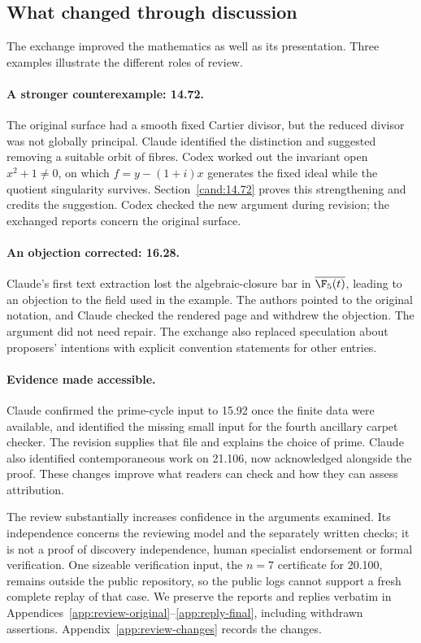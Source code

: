 \subsection{What changed through discussion}

The exchange improved the mathematics as well as its presentation.
Three examples illustrate the different roles of review.

\paragraph{A stronger counterexample: 14.72.}
The original surface had a smooth fixed Cartier divisor, but the reduced
divisor was not globally principal. Claude identified the distinction
and suggested removing a suitable orbit of fibres. Codex worked out
the invariant open \(x^2+1\ne0\), on which
\(f=y-(1+i)x\) generates the fixed ideal while the quotient singularity
survives. Section~\ref{cand:14.72} proves this strengthening and credits
the suggestion. Codex checked the new argument during revision; the exchanged reports
concern the original surface.

\paragraph{An objection corrected: 16.28.}
Claude's first text extraction lost the algebraic-closure bar in
\(\overline{\F_5(t)}\), leading to an objection to the field used in
the example. The authors pointed to the original notation, and Claude
checked the rendered page and withdrew the objection. The argument did
not need repair. The exchange also replaced speculation about proposers'
intentions with explicit convention statements for other entries.

\paragraph{Evidence made accessible.}
Claude confirmed the prime-cycle input to 15.92 once the finite data
were available, and identified the missing small input for the fourth
ancillary carpet checker. The revision supplies that file and explains
the choice of prime. Claude also identified contemporaneous work on
21.106, now acknowledged alongside the proof. These changes improve
what readers can check and how they can assess attribution.

The review substantially increases confidence in the arguments examined.
Its independence concerns the reviewing model and the separately written
checks; it is not a proof of discovery independence, human specialist
endorsement or formal verification. One sizeable verification input,
the \(n=7\) certificate for 20.100, remains outside the public repository,
so the public logs cannot support a fresh complete replay of that case.
We preserve the reports and replies verbatim in
Appendices~\ref{app:review-original}--\ref{app:reply-final}, including
withdrawn assertions. Appendix~\ref{app:review-changes} records the changes.

